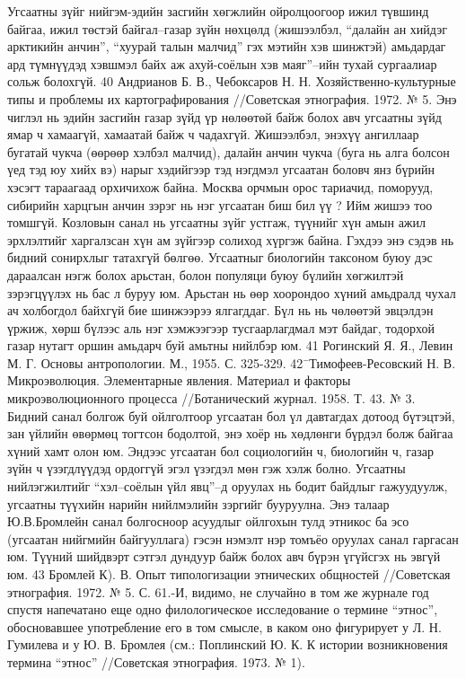 Угсаатны зүйг нийгэм-эдийн засгийн хөгжлийн ойролцоогоор ижил түвшинд байгаа, ижил төстэй байгал–газар зүйн нөхцөлд (жишээлбэл, “далайн ан хийдэг арктикийн анчин”, “хуурай талын малчид” гэх мэтийн хэв шинжтэй) амьдардаг ард түмнүүдэд хэвшмэл байх аж ахуй-соёлын хэв маяг”–ийн тухай сургаалиар сольж болохгүй.
40 Андрианов Б. В., Чебоксаров Н. Н. Хозяйственно-культурные типы и проблемы их картографирования //Советская этнография. 1972. № 5.
Энэ чиглэл нь эдийн засгийн газар зүйд үр нөлөөтөй байж болох авч угсаатны зүйд ямар ч хамаагүй, хамаатай байж ч чадахгүй. Жишээлбэл, энэхүү ангиллаар бугатай чукча (өөрөөр хэлбэл малчид), далайн анчин чукча (буга нь алга болсон үед тэд юу хийх вэ) нарыг хэдийгээр тэд нэгдмэл угсаатан боловч янз бүрийн хэсэгт тараагаад орхичихож байна. Москва орчмын орос тариачид, поморууд, сибирийн харцгын анчин зэрэг нь нэг угсаатан биш бил үү ? Ийм жишээ тоо томшгүй. Козловын санал нь угсаатны зүйг устгаж, түүнийг хүн амын ажил эрхлэлтийг харгалзсан хүн ам зүйгээр солиход хүргэж байна. Гэхдээ энэ сэдэв нь бидний сонирхлыг татахгүй бөлгөө.
Угсаатныг биологийн таксоном буюу дэс дараалсан нэгж болох арьстан, болон популяци буюу бүлийн хөгжилтэй зэрэгцүүлэх нь бас л буруу юм. Арьстан нь өөр хоорондоо хүний амьдралд чухал ач холбогдол байхгүй бие шинжээрээ ялгагддаг. Бүл нь нь чөлөөтэй эвцэлдэн үржиж, хөрш бүлээс аль нэг хэмжээгээр тусгаарлагдмал мэт байдаг, тодорхой газар нутагт оршин амьдарч буй амьтны нийлбэр юм.
41 Рогинский Я. Я., Левин М. Г. Основы антропологии. М., 1955. С. 325-329. 42¯Тимофеев-Ресовский Н. В. Микроэволюция. Элементарные явления. Материал и факторы микроэволюционного процесса //Ботанический журнал. 1958. Т. 43. № 3.
Бидний санал болгож буй ойлголтоор угсаатан бол үл давтагдах дотоод бүтэцтэй, зан үйлийн өвөрмөц тогтсон бодолтой, энэ хоёр нь хөдлөнги бүрдэл болж байгаа хүний хамт олон юм. Эндээс угсаатан бол социологийн ч, биологийн ч, газар зүйн ч үзэгдлүүдэд ордоггүй эгэл үзэгдэл мөн гэж хэлж болно.
Угсаатны нийлэгжилтийг “хэл–соёлын үйл явц”–д оруулах нь бодит байдлыг гажуудуулж, угсаатны түүхийн нарийн нийлмэлийн зэргийг бууруулна. Энэ талаар Ю.В.Бромлейн санал болгосноор асуудлыг ойлгохын тулд этникос ба эсо (угсаатан нийгмийн байгууллага) гэсэн нэмэлт нэр томъёо оруулах санал гаргасан юм. Түүний шийдвэрт сэтгэл дундуур байж болох авч бүрэн үгүйсгэх нь эвгүй юм.
43 Бромлей К). В. Опыт типологизации этнических общностей //Советская этнография. 1972. № 5. С. 61.-И, видимо, не случайно в том же журнале год спустя напечатано еще одно филологическое исследование о термине “этнос”, обосновавшее употребление его в том смысле, в каком оно фигурирует у Л. Н. Гумилева и у Ю. В. Бромлея (см.: Поплинский Ю. К. К истории возникновения термина “этнос” //Советская этнография. 1973. № 1).

